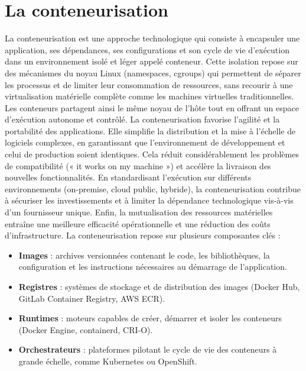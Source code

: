 \section{La conteneurisation}

La conteneurisation est une approche technologique qui consiste à encapsuler une application, ses dépendances, ses configurations et son cycle de vie d’exécution dans un environnement isolé et léger appelé conteneur. Cette isolation repose sur des mécanismes du noyau Linux (namespaces, cgroups) qui permettent de séparer les processus et de limiter leur consommation de ressources, sans recourir à une virtualisation matérielle complète comme les machines virtuelles traditionnelles. Les conteneurs partagent ainsi le même noyau de l’hôte tout en offrant un espace d’exécution autonome et contrôlé.
La conteneurisation favorise l’agilité et la portabilité des applications. Elle simplifie la distribution et la mise à l’échelle de logiciels complexes, en garantissant que l’environnement de développement et celui de production soient identiques. Cela réduit considérablement les problèmes de compatibilité (« it works on my machine ») et accélère la livraison des nouvelles fonctionnalités. En standardisant l’exécution sur différents environnements (on-premise, cloud public, hybride), la conteneurisation contribue à sécuriser les investissements et à limiter la dépendance technologique vis-à-vis d’un fournisseur unique. Enfin, la mutualisation des ressources matérielles entraîne une meilleure efficacité opérationnelle et une réduction des coûts d’infrastructure.
La conteneurisation repose sur plusieurs composantes clés :
\begin{itemize}
	\item \textbf{Images} : archives versionnées contenant le code, les bibliothèques, la configuration et les instructions nécessaires au démarrage de l’application.
	\item \textbf{Registres} : systèmes de stockage et de distribution des images (Docker Hub, GitLab Container Registry, AWS ECR).
	\item \textbf{Runtimes} : moteurs capables de créer, démarrer et isoler les conteneurs (Docker Engine, containerd, CRI-O).
	\item \textbf{Orchestrateurs} : plateformes pilotant le cycle de vie des conteneurs à grande échelle, comme Kubernetes ou OpenShift.
\end{itemize}

